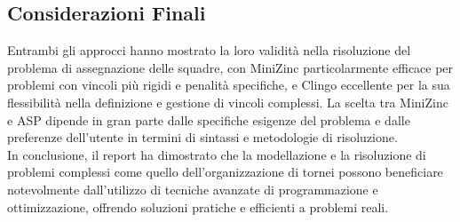 \documentclass{article}
\begin{document}
\begin{multicols*}{2}
\subsection{Considerazioni Finali}

Entrambi gli approcci hanno mostrato la loro validità nella risoluzione del problema di assegnazione delle squadre, con MiniZinc particolarmente efficace per problemi con vincoli più rigidi e penalità specifiche, e Clingo eccellente per la sua flessibilità nella definizione e gestione di vincoli complessi. La scelta tra MiniZinc e ASP dipende in gran parte dalle specifiche esigenze del problema e dalle preferenze dell'utente in termini di sintassi e metodologie di risoluzione.
\\
In conclusione, il report ha dimostrato che la modellazione e la risoluzione di problemi complessi come quello dell'organizzazione di tornei possono beneficiare notevolmente dall'utilizzo di tecniche avanzate di programmazione e ottimizzazione, offrendo soluzioni pratiche e efficienti a problemi reali.

\end{multicols*}
\end{document}

